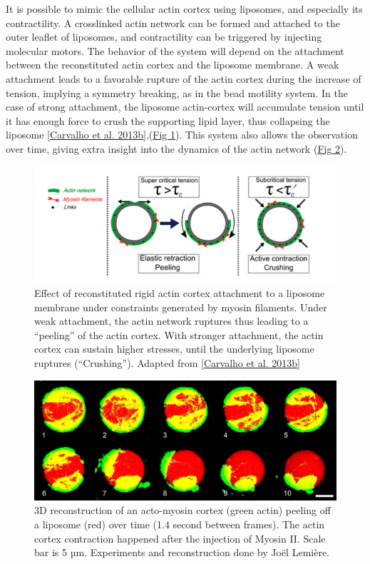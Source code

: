 \documentclass[A4paperpaper,11pt,english]{sphinxmanual}
\begin{document}
It is possible to mimic the cellular actin cortex using liposomes, and especially
its contractility. A crosslinked actin network can be formed and attached to
the outer leaflet of liposomes, and contractility can be triggered by injecting
molecular motors. The behavior of the system will depend on the attachment
between the reconstituted actin cortex and the liposome membrane.  A weak attachment
leads to a favorable rupture of the actin cortex during the increase of tension,
implying a symmetry breaking, as in the bead motility system.  In the case of strong
attachment, the liposome actin-cortex will accumulate tension until it has
enough force to crush the supporting lipid layer, thus collapsing the liposome
{\hyperref[index-latex:carvalho2013]{{[}Carvalho et al. 2013b{]}}},(\hyperref[index-latex:fig-peeling-scheme]{Fig  \ref*{index-latex:fig-peeling-scheme}}). This system also allows the observation
over time, giving extra insight into the dynamics of the actin network (\hyperref[index-latex:fig-peeling-3d]{Fig  \ref*{index-latex:fig-peeling-3d}}).
\begin{figure}[htbp]
\centering
\capstart

\includegraphics[width=0.800\linewidth]{joel-2-11.png}
\caption{Effect of reconstituted rigid actin cortex attachment to a liposome
membrane under constraints generated by myosin filaments. Under weak attachment,
the actin network ruptures thus leading to a ``peeling'' of the actin cortex.
With stronger attachment, the actin cortex can sustain higher stresses, until
the underlying liposome ruptures (``Crushing''). Adapted from
{\hyperref[index-latex:carvalho2013]{{[}Carvalho et al. 2013b{]}}}}\label{index-latex:fig-peeling-scheme}\end{figure}
\begin{figure}[htbp]
\centering
\capstart

\includegraphics[width=0.900\linewidth]{joel-5-12.png}
\caption{3D reconstruction of an acto-myosin cortex (green actin) peeling off a
liposome (red) over time (1.4 second between frames). The actin cortex
contraction happened after the injection of Myosin II. Scale bar is 5 µm.
Experiments and reconstruction done by Joël Lemière.}\label{index-latex:fig-peeling-3d}\end{figure}
\end{document}
